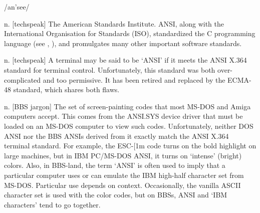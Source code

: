 /an'see/

\begin{inparaenum}
	\item n. [techspeak] The American Standards Institute. ANSI, along with the International Organisation for Standards (ISO), standardized
		the C programming language (see , ), and promulgates many other important software standards.
	\item n. [techspeak] A terminal may be said to be `ANSI' if it meets the ANSI X.364 standard for terminal control. Unfortunately, this
		standard was both over-complicated and too permissive. It has been retired and replaced by the ECMA-48 standard, which shares both
		flaws.
	\item n. [BBS jargon] The set of screen-painting codes that most MS-DOS and Amiga computers accept. This comes from the ANSI.SYS device
		driver that must be loaded on an MS-DOS computer to view such codes. Unfortunately, neither DOS ANSI nor the BBS ANSIs derived from
		it exactly match the ANSI X.364 terminal standard. For example, the ESC-[1m code turns on the bold highlight on large machines, but
		in IBM PC/MS-DOS ANSI, it turns on `intense' (bright) colors. Also, in BBS-land, the term `ANSI' is often used to imply that a
		particular computer uses or can emulate the IBM high-half character set from MS-DOS. Particular use depends on context.
		Occasionally, the vanilla ASCII character set is used with the color codes, but on BBSs, ANSI and `IBM characters' tend to go
		together.
\end{inparaenum}

